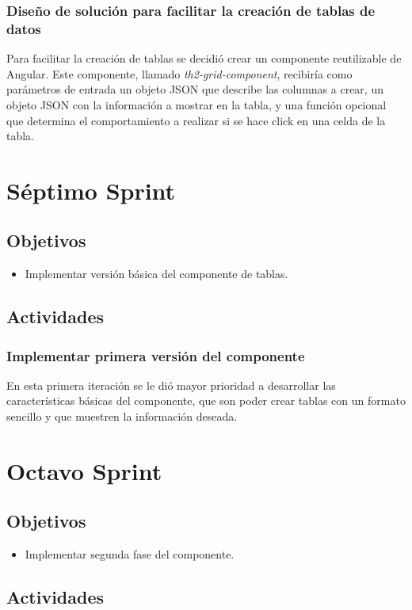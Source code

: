 \subsubsection{Diseño de solución para facilitar la creación de tablas de datos}
Para facilitar la creación de tablas se decidió crear un componente reutilizable
de Angular. Este componente, llamado \emph{th2-grid-component}, recibiría como
parámetros de entrada un objeto JSON que describe las columnas a crear, un objeto
JSON con la información a mostrar en la tabla, y una función opcional que determina
el comportamiento a realizar si se hace click en una celda de la tabla.

\section{Séptimo Sprint}

\subsection{Objetivos}
\begin{itemize}
  \item Implementar versión básica del componente de tablas.
\end{itemize}
\subsection{Actividades}
\subsubsection{Implementar primera versión del componente}
En esta primera iteración se le dió mayor prioridad a desarrollar las características
básicas del componente, que son poder crear tablas con un formato sencillo y que muestren
la información deseada.


\section{Octavo Sprint}

\subsection{Objetivos}
\begin{itemize}
  \item Implementar segunda fase del componente.
\end{itemize}
\subsection{Actividades}
